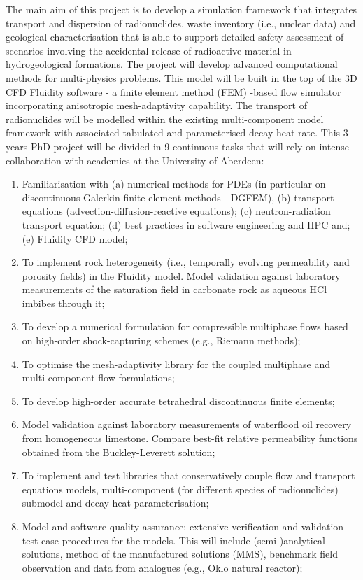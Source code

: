 \documentclass[12pts,a4paper,amsmath,amssymb,floatfix]{article}%
\begin{document}
\begin{enumerate}[label=\bfseries Project: \arabic*:]
The main aim of this project is to develop a simulation framework that integrates transport and dispersion of radionuclides, waste inventory (i.e., nuclear data) and geological characterisation that is able to support detailed safety assessment of scenarios involving the accidental release of radioactive material in hydrogeological formations. The project will develop advanced computational methods for multi-physics problems. This model will be built in the top of the 3D CFD Fluidity software - a finite element method (FEM) -based flow simulator incorporating anisotropic mesh-adaptivity capability. The transport of radionuclides will be modelled within the existing multi-component model framework with associated tabulated and parameterised decay-heat rate. This 3-years PhD project will be divided in 9 continuous tasks that will rely on intense collaboration with academics at the University of Aberdeen:
\begin{enumerate}
   \item Familiarisation with (a) numerical methods for PDEs (in particular on discontinuous Galerkin finite element methods - DGFEM), (b) transport equations (advection-diffusion-reactive equations); (c) neutron-radiation transport equation; (d) best practices in software engineering and HPC and; (e) Fluidity CFD model;
   \item To implement rock heterogeneity (i.e., temporally evolving permeability and porosity fields) in the Fluidity model. Model validation against laboratory measurements of the saturation field in carbonate rock as aqueous HCl imbibes through it;
   \item To develop a numerical formulation for compressible multiphase flows based on high-order shock-capturing schemes (e.g., Riemann methods);
   \item To optimise the mesh-adaptivity library for the coupled multiphase and multi-component flow formulations;
   \item To develop high-order accurate tetrahedral discontinuous finite elements;
   \item Model validation against laboratory measurements of waterflood oil recovery from homogeneous limestone. Compare best-fit relative permeability functions obtained from the Buckley-Leverett solution;
   \item To implement and test libraries that conservatively couple flow and transport equations models, multi-component (for different species of radionuclides) submodel and decay-heat parameterisation;
   \item Model and software quality assurance: extensive verification and validation test-case procedures for the models. This will include (semi-)analytical solutions, method of the manufactured solutions (MMS), benchmark field observation and data from analogues (e.g., Oklo natural reactor);
\end{enumerate}



\end{enumerate}
\end{document}

